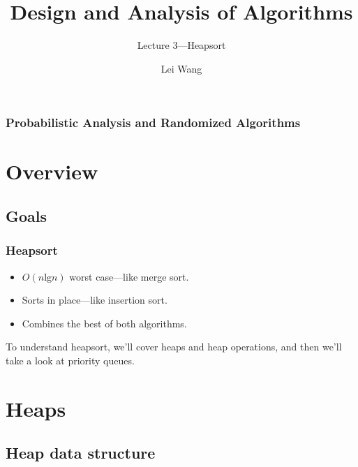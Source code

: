 \documentclass[notes,serif]{beamer}
\title{Design and Analysis of Algorithms}
\subtitle{Lecture 3---Heapsort}
\author{Lei Wang}
\institute{Dalian University of Technology}
\begin{document}
\begin{frame}
  \titlepage
\end{frame}

\begin{frame}
  \frametitle{Probabilistic Analysis and Randomized Algorithms}
  \tableofcontents
\end{frame}

\section{Overview}
\subsection{Goals}

\begin{frame}
\frametitle{Heapsort}
\begin{itemize}
    \item $O(n \text{lg} n)$ worst case---like merge sort.
    \item Sorts in place---like insertion sort.
    \item Combines the best of both algorithms.
\end{itemize}
To understand heapsort, we'll cover heaps and heap operations, and then we'll take a look at priority queues.

\end{frame}

\section{Heaps}

\subsection{Heap data structure}
\end{document}
